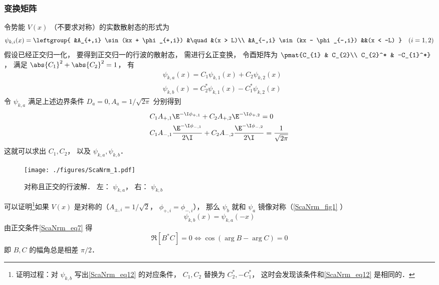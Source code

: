 \subsubsection{变换矩阵}
令势能 $V(x)$ （不要求对称）的实数散射态的形式为
\begin{equation}
\psi_{k,i}(x) = \leftgroup{
    &A_{+,i} \sin(kx + \phi_{+,i}) &\quad &(x > L)\\
    &A_{-,i} \sin(kx - \phi_{-,i}) &&(x < -L)
} \quad (i = 1,2)
\end{equation}
假设已经正交归一化， 要得到正交归一的行波的散射态， 需进行幺正变换， 令酉矩阵为 $\pmat{C_{1} & C_{2}\\ C_{2}^* & -C_{1}^*}$， 满足 $\abs{C_1}^2 + \abs{C_2}^2 = 1$， 有
\begin{equation}
\begin{aligned}
&\psi_{k,a}(x) = C_1\psi_{k,1}(x) + C_2\psi_{k,2}(x)\\
&\psi_{k,b}(x) = C_{2}^*\psi_{k,1}(x) - C_{1}^*\psi_{k,2}(x)
\end{aligned}
\end{equation}
令 $\psi_{k,a}$ 满足上述边界条件 $D_a = 0, A_a = 1/\sqrt{2\pi}$ 分别得到
\begin{equation}\label{ScaNrm_eq12}
\begin{aligned}
&C_1 A_{+,1}\E^{-\I\phi_{+,1}} + C_2 A_{+,2}\E^{-\I\phi_{+,2}} = 0\\
&C_1 A_{-,1}\frac{\E^{-\I\phi_{-,1}}}{2\I} + C_2 A_{-,2}\frac{\E^{-\I\phi_{-,2}}}{2\I} = \frac{1}{\sqrt{2\pi}}
\end{aligned}
\end{equation}
这就可以求出 $C_1, C_2$， 以及 $\psi_{k,a}, \psi_{k,b}$．

\begin{figure}[ht]
\centering
\texttt{[image: ./figures/ScaNrm\_1.pdf]}
\caption{对称且正交的行波解． 左： $\psi_{k,a}$， 右： $\psi_{k,b}$} \label{ScaNrm_fig1}
\end{figure}

可以证明\footnote{证明过程：对 $\psi_{k,b}$ 写出\autoref{ScaNrm_eq12} 的对应条件， $C_1,C_2$ 替换为 $C_2^*, -C_1^*$， 这时会发现该条件和\autoref{ScaNrm_eq12} 是相同的．}如果 $V(x)$ 是对称的（$A_{\pm,i} = 1/\sqrt{2}$， $\phi_{+,i}=\phi_{-,i}$）， 那么 $\psi_b$ 就和 $\psi_a$ 镜像对称（\autoref{ScaNrm_fig1} ）
\begin{equation}
\psi_{k,b}(x) = \psi_{k,a}(-x)
\end{equation}
由正交条件\autoref{ScaNrm_eq7} 得
\begin{equation}\label{ScaNrm_eq11}
\Re[B^*C] = 0 \Longleftrightarrow \cos(\arg{B} - \arg{C}) = 0
\end{equation}
即 $B,C$ 的幅角总是相差 $\pi/2$．
